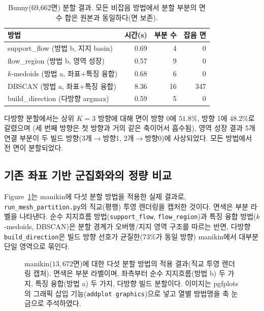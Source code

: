 \documentclass[11pt,a4paper]{article}
\begin{document}
\begin{table}[H]
\centering
\caption{Bunny(69{,}662면) 분할 결과.
모든 비잡음 방법에서 분할 부분의 면 수 합은 원본과 동일하다(면 보존).}
\label{tab:partition}
\begin{tabular}{lrrr}
\toprule
방법 & 시간(s) & 부분 수 & 잡음 면\\
\midrule
support\_flow (방법 b, 지지 basin)   & 0.69 & 4  & 0\\
flow\_region (방법 b, 영역 성장)     & 0.57 & 9  & 0\\
$k$-medoids (방법 a, 좌표+특징 융합)  & 0.68 & 6  & 0\\
DBSCAN (방법 a, 좌표+특징 융합)      & 8.36 & 16 & 347\\
build\_direction (다방향 argmax)    & 0.59 & 5  & 0\\
\bottomrule
\end{tabular}
\end{table}

다방향 분할에서는 상위 $K=3$ 방향에 대해 면이
방향 0에 $51.8\%$, 방향 1에 $48.2\%$로 갈렸으며
(세 번째 방향은 첫 방향과 거의 같은 축이어서 흡수됨),
영역 성장 결과 5개 연결 부분이 두 빌드 방향(3개$\to$방향1, 2개$\to$방향0)에 사상되었다.
모든 방법에서 전 면이 분할되었다.

\subsection{기존 좌표 기반 군집화와의 정량 비교}
\label{sec:purity}

Figure~\ref{fig:partition-capture}는 manikin에 다섯 분할 방법을 적용한 실제 결과로,
\texttt{run\_mesh\_partition.py}의 직교(평행) 투영 렌더링을 캡처한 것이다.
면색은 부분 라벨을 나타낸다.
순수 지지흐름 방법(\texttt{support\_flow}, \texttt{flow\_region})과
특징 융합 방법($k$-medoids, DBSCAN)은 분할 경계가 오버행/지지 영역 구조를 따르는 반면,
다방향 \texttt{build\_direction}은 빌드 방향 선호가 균질한(73\%가 동일 방향) manikin에서
대부분 단일 영역으로 묶인다.

\begin{figure}[H]
\centering
{}
\caption{manikin($13{,}672$면)에 대한 다섯 분할 방법의 적용 결과(직교 투영 렌더링 캡처).
면색은 부분 라벨이며, 좌측부터 순수 지지흐름(방법 b) 두 가지, 특징 융합(방법 a) 두 가지,
다방향 빌드 분할이다. 이미지는 pgfplots의 그래픽 삽입 기능(\texttt{addplot graphics})으로 넣고
열별 방법명을 축 눈금으로 주석하였다.}
\label{fig:partition-capture}
\end{figure}
\end{document}
